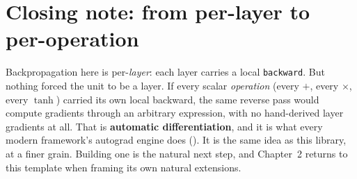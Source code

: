 \section{Closing note: from per-layer to per-operation}\label{sec:autograd-note}

Backpropagation here is per-\emph{layer}: each layer carries a local
\texttt{backward}. But nothing forced the unit to be a layer. If every
scalar \emph{operation} (every $+$, every $\times$, every $\tanh$)
carried its own local backward, the same reverse pass would compute
gradients through an arbitrary expression, with no hand-derived layer
gradients at all. That is \textbf{automatic differentiation}, and it is
what every modern framework's autograd engine does
(\cite{baydin2018autodiff}). It is the same idea as this library, at a
finer grain. Building one is the natural next step, and Chapter~2
returns to this template when framing its own natural extensions.
